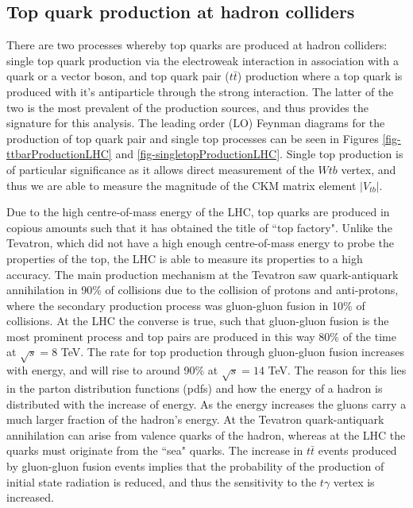 \subsection{Top quark production at hadron colliders} \label{subsec-TopProduction}

There are two processes whereby top quarks are produced at hadron colliders: single top quark production via the electroweak interaction in 
association with a quark or a vector boson, and top quark pair ($t\bar{t}$) production where a top quark is produced with it's antiparticle 
through the strong interaction. The latter of the two is the most prevalent of the production sources, and thus provides the signature for this 
analysis. The leading order (LO) Feynman diagrams for the production of top quark pair and single top processes can be seen in Figures \ref{fig-ttbarProductionLHC} and \ref{fig-singletopProductionLHC}. Single top production is of particular significance as it allows direct measurement 
of the $Wtb$ vertex, and thus we are able to measure the magnitude of the CKM matrix element $|V_{tb}|$.

Due to the high centre-of-mass energy of the LHC, top quarks are produced in copious amounts such that it has obtained the title of ``top 
factory". Unlike the Tevatron, which did not have a high enough centre-of-mass energy to probe the properties of the top, the LHC is able to 
measure its properties to a high accuracy. The main production mechanism at the Tevatron saw quark-antiquark annihilation in 90\% \cite{
Kidonakis:2012db} of collisions due to the collision of protons and anti-protons, where the secondary production process was gluon-gluon fusion 
in 10\% of collisions. At the LHC the converse is true, such that gluon-gluon fusion is the most prominent process and top pairs are produced 
in this way 80\% of the time at $\sqrt{s} = 8$ TeV. The rate for top production through gluon-gluon fusion increases with energy, and will rise 
to around 90\% at $\sqrt{s} = 14$ TeV. The reason for this lies in the parton distribution functions (pdfs) and how the energy of a hadron is 
distributed with the increase of energy. As the energy increases the gluons carry a much larger fraction of the hadron's energy. At the 
Tevatron quark-antiquark annihilation can arise from valence quarks of the hadron, whereas at the LHC the quarks must originate from the ``sea" 
quarks. The increase in $t\bar{t}$ events produced by gluon-gluon fusion events implies that the probability of the production of initial state 
radiation is reduced, and thus the sensitivity to the $t\gamma$ vertex is increased.

